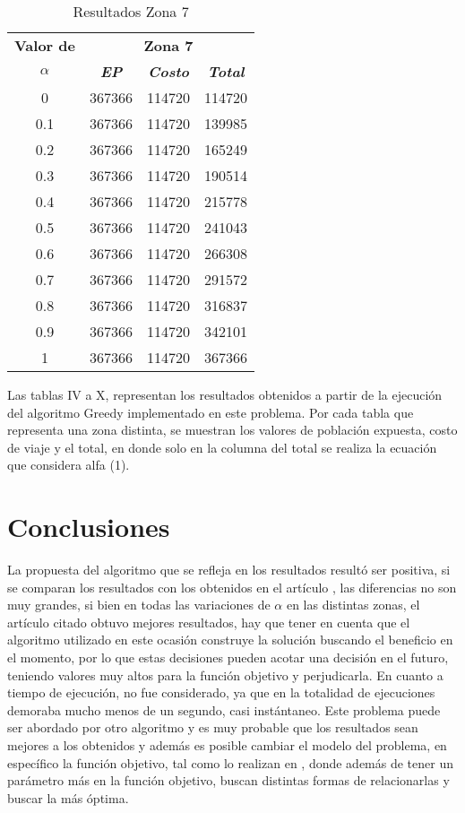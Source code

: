 \documentclass[conference]{IEEEtran}
\begin{document}
\begin{table}[H]
\caption{Resultados Zona 7}
\begin{center}
\begin{tabular}{|c|c|c|c|}
\hline
\textbf{Valor de}&\multicolumn{3}{|c|}{\textbf{Zona 7}} \\
\cline{2-4} 
\textbf{$\alpha$} & \textbf{\textit{EP}}& \textbf{\textit{Costo}}& \textbf{\textit{Total}} \\
\hline
0&367366&114720&114720\\ \hline
0.1&367366&114720&139985\\ \hline
0.2&367366&114720&165249\\ \hline
0.3&367366&114720&190514\\ \hline
0.4&367366&114720&215778\\ \hline
0.5&367366&114720&241043\\ \hline
0.6&367366&114720&266308\\ \hline
0.7&367366&114720&291572\\ \hline
0.8&367366&114720&316837\\ \hline
0.9&367366&114720&342101\\ \hline
1&367366&114720&367366\\ \hline
\end{tabular}
\label{tab1}
\end{center}
\end{table}

Las tablas IV a X, representan los resultados obtenidos a partir de la ejecuci\'on del algoritmo Greedy implementado en este problema. Por cada tabla que representa una zona distinta, se muestran los valores de poblaci\'on expuesta, costo de viaje y el total, en donde solo en la columna del total se realiza la ecuaci\'on que considera alfa (1). 




\section{Conclusiones}


La propuesta del algoritmo que se refleja en los resultados result\'o ser positiva, si se comparan los resultados con los obtenidos en el art\'iculo \cite{b2}, las diferencias no son muy grandes, si bien en todas las variaciones de $\alpha$ en las distintas zonas, el art\'iculo citado obtuvo mejores resultados, hay que tener en cuenta que el algoritmo utilizado en este ocasi\'on construye la soluci\'on buscando el beneficio en el momento, por lo que estas decisiones pueden acotar una decisi\'on en el futuro, teniendo valores muy altos para la funci\'on objetivo y perjudicarla. 
En cuanto a tiempo de ejecuci\'on, no fue considerado, ya que en la totalidad de ejecuciones demoraba mucho menos de un segundo, casi inst\'antaneo. Este problema puede ser abordado por otro algoritmo y es muy probable que los resultados sean mejores a los obtenidos y adem\'as es posible cambiar el modelo del problema, en espec\'ifico la funci\'on objetivo, tal como lo realizan en \cite{b1}, donde adem\'as de tener un par\'ametro m\'as en la funci\'on objetivo, buscan distintas formas de relacionarlas y buscar la m\'as \'optima.
\end{document}

